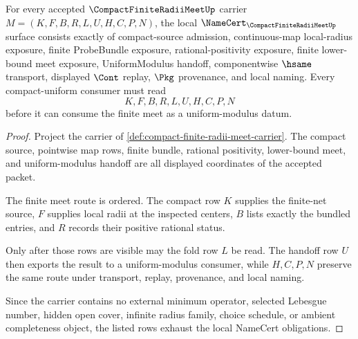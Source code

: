 \begin{theorem}
\label{thm:compact-finite-radii-meet-namecert-obligations}
For every accepted $\CompactFiniteRadiiMeetUp$ carrier $M=(K,F,B,R,L,U,H,C,P,N)$, the local $\NameCert_{\CompactFiniteRadiiMeetUp}$ surface consists exactly of compact-source admission, continuous-map local-radius exposure, finite ProbeBundle exposure, rational-positivity exposure, finite lower-bound meet exposure, UniformModulus handoff, componentwise $\hsame$ transport, displayed $\Cont$ replay, $\Pkg$ provenance, and local naming. Every compact-uniform consumer must read
$$
K,F,B,R,L,U,H,C,P,N
$$
before it can consume the finite meet as a uniform-modulus datum.
\end{theorem}
\begin{proof}
Project the carrier of \autoref{def:compact-finite-radii-meet-carrier}. The compact source, pointwise map rows, finite bundle, rational positivity, lower-bound meet, and uniform-modulus handoff are all displayed coordinates of the accepted packet.

The finite meet route is ordered. The compact row $K$ supplies the finite-net source, $F$ supplies local radii at the inspected centers, $B$ lists exactly the bundled entries, and $R$ records their positive rational status.

Only after those rows are visible may the fold row $L$ be read. The handoff row $U$ then exports the result to a uniform-modulus consumer, while $H,C,P,N$ preserve the same route under transport, replay, provenance, and local naming.

Since the carrier contains no external minimum operator, selected Lebesgue number, hidden open cover, infinite radius family, choice schedule, or ambient completeness object, the listed rows exhaust the local NameCert obligations.
\end{proof}




